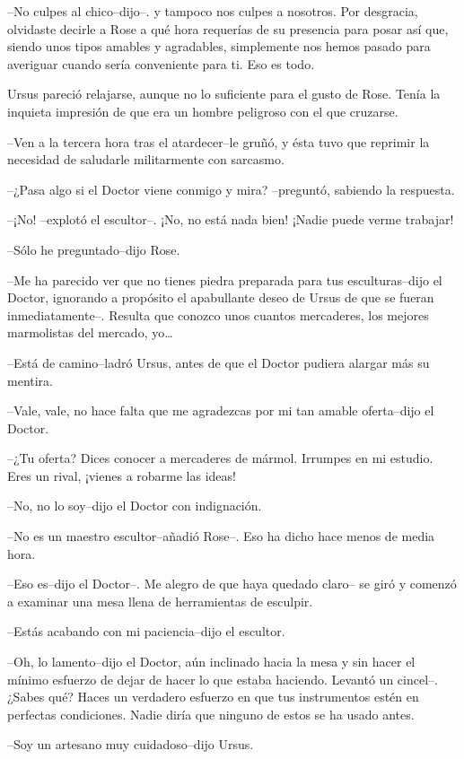 --No culpes al chico--dijo--. y tampoco nos culpes a nosotros. Por
desgracia, olvidaste decirle a Rose a qué hora requerías de su presencia
para posar así que, siendo unos tipos amables y agradables, simplemente
nos hemos pasado para averiguar cuando sería conveniente para ti. Eso es
todo.

Ursus pareció relajarse, aunque no lo suficiente para el gusto de Rose.
Tenía la inquieta impresión de que era un hombre peligroso con el que
cruzarse.

--Ven a la tercera hora tras el atardecer--le gruñó, y ésta tuvo que
reprimir la necesidad de saludarle militarmente con sarcasmo.

--¿Pasa algo si el Doctor viene conmigo y mira? --preguntó, sabiendo la
respuesta.

--¡No! --explotó el escultor--. ¡No, no está nada bien! ¡Nadie puede
verme trabajar!

--Sólo he preguntado--dijo Rose.

--Me ha parecido ver que no tienes piedra preparada para tus
esculturas--dijo el Doctor, ignorando a propósito el apabullante deseo
de Ursus de que se fueran inmediatamente--. Resulta que conozco unos
cuantos mercaderes, los mejores marmolistas del mercado, yo\ldots{}

--Está de camino--ladró Ursus, antes de que el Doctor pudiera alargar
más su mentira.

--Vale, vale, no hace falta que me agradezcas por mi tan amable
oferta--dijo el Doctor.

--¿Tu oferta? Dices conocer a mercaderes de mármol. Irrumpes en mi
estudio. Eres un rival, ¡vienes a robarme las ideas!

--No, no lo soy--dijo el Doctor con indignación.

--No es un maestro escultor--añadió Rose--. Eso ha dicho hace menos de
media hora.

--Eso es--dijo el Doctor--. Me alegro de que haya quedado claro-- se
giró y comenzó a examinar una mesa llena de herramientas de esculpir.

--Estás acabando con mi paciencia--dijo el escultor.

--Oh, lo lamento--dijo el Doctor, aún inclinado hacia la mesa y sin
hacer el mínimo esfuerzo de dejar de hacer lo que estaba haciendo.
Levantó un cincel--. ¿Sabes qué? Haces un verdadero esfuerzo en que tus
instrumentos estén en perfectas condiciones. Nadie diría que ninguno de
estos se ha usado antes.

--Soy un artesano muy cuidadoso--dijo Ursus.

